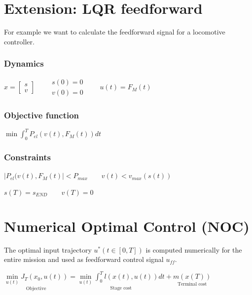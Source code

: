 \documentclass[10pt,a4paper]{scrartcl}
\begin{document}
\begin{multicols*}{3}
	\section[LQR feedforward]{Extension: LQR feedforward}
	
	
	For example we want to calculate the feedforward signal for a locomotive controller.
	
	\subsubsection{Dynamics}
	
	$x=\begin{bmatrix}s\\v\end{bmatrix}\qquad \begin{matrix}s(0)=0\\v(0)=0\end{matrix}\qquad u(t)=F_M(t)$
	
	\subsubsection{Objective function}
	
	$\min \int_0^T{P_{el}(v(t),F_M(t))dt}$
	
	\subsubsection{Constraints}
	
	$|P_{el}(v(t),F_M(t)|<P_{max}\qquad v(t)<v_{max}(s(t))$
	
	$s(T)=s_{END}\qquad v(T)=0$
	
	\section[NOC]{Numerical Optimal Control (NOC)}
	
	The optimal input trajectory $u^*(t\in[0,T])$ is computed numerically for the entire mission and used as feedforward control signal $u_{ff}$.
	
	\begin{center}	
	
	$\underset{\text{Objective}}{\min\limits_{u(t)}J_T\left(x_0,u(t)\right)}=\underset{\text{Stage cost}}{\min\limits_{u(t)}\int_0^T{l\left(x(t),u(t)\right)dt}}+\underset{\text{Terminal cost}}{m\left(x(T)\right)}$
	
	\finn
	

\end{center}
\end{multicols*}
\end{document}
